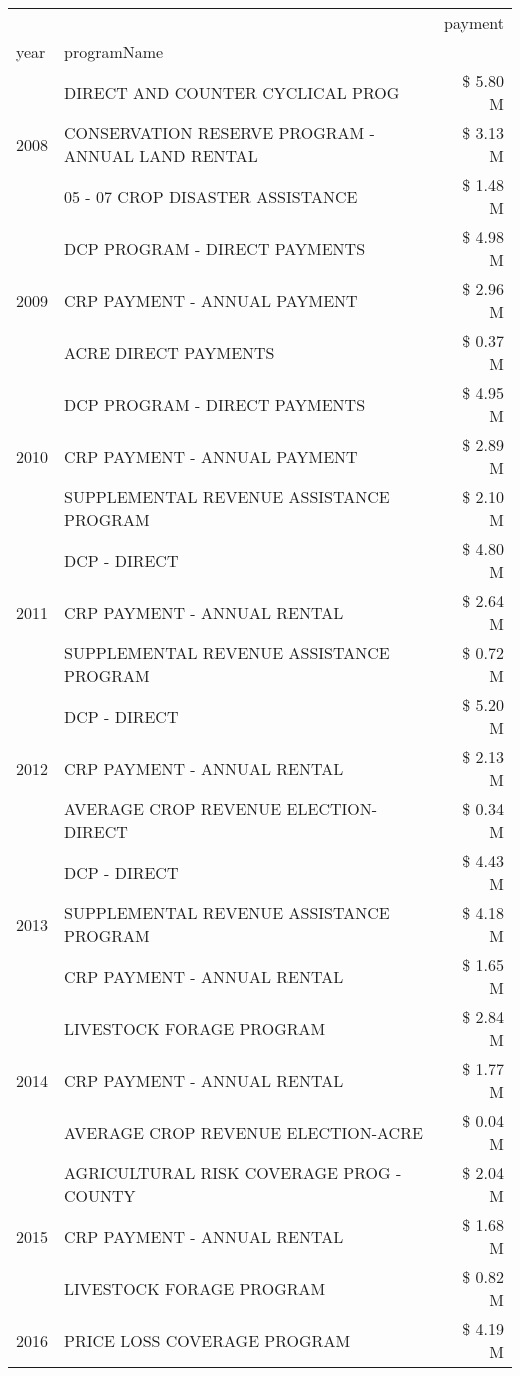 \begin{tabular}{llr}
\toprule
 &  & payment \\
year & programName &  \\
\midrule
\multirow[t]{3}{*}{2008} & DIRECT AND COUNTER CYCLICAL PROG & \$ 5.80 M \\
 & CONSERVATION RESERVE PROGRAM - ANNUAL LAND RENTAL & \$ 3.13 M \\
 & 05 - 07 CROP DISASTER ASSISTANCE & \$ 1.48 M \\
\cline{1-3}
\multirow[t]{3}{*}{2009} & DCP PROGRAM - DIRECT PAYMENTS & \$ 4.98 M \\
 & CRP PAYMENT - ANNUAL PAYMENT & \$ 2.96 M \\
 & ACRE DIRECT PAYMENTS & \$ 0.37 M \\
\cline{1-3}
\multirow[t]{3}{*}{2010} & DCP PROGRAM - DIRECT PAYMENTS & \$ 4.95 M \\
 & CRP PAYMENT - ANNUAL PAYMENT & \$ 2.89 M \\
 & SUPPLEMENTAL REVENUE ASSISTANCE PROGRAM & \$ 2.10 M \\
\cline{1-3}
\multirow[t]{3}{*}{2011} & DCP - DIRECT & \$ 4.80 M \\
 & CRP PAYMENT - ANNUAL RENTAL & \$ 2.64 M \\
 & SUPPLEMENTAL REVENUE ASSISTANCE PROGRAM & \$ 0.72 M \\
\cline{1-3}
\multirow[t]{3}{*}{2012} & DCP - DIRECT & \$ 5.20 M \\
 & CRP PAYMENT - ANNUAL RENTAL & \$ 2.13 M \\
 & AVERAGE CROP REVENUE ELECTION-DIRECT & \$ 0.34 M \\
\cline{1-3}
\multirow[t]{3}{*}{2013} & DCP - DIRECT & \$ 4.43 M \\
 & SUPPLEMENTAL REVENUE ASSISTANCE PROGRAM & \$ 4.18 M \\
 & CRP PAYMENT - ANNUAL RENTAL & \$ 1.65 M \\
\cline{1-3}
\multirow[t]{3}{*}{2014} & LIVESTOCK FORAGE PROGRAM & \$ 2.84 M \\
 & CRP PAYMENT - ANNUAL RENTAL & \$ 1.77 M \\
 & AVERAGE CROP REVENUE ELECTION-ACRE & \$ 0.04 M \\
\cline{1-3}
\multirow[t]{3}{*}{2015} & AGRICULTURAL RISK COVERAGE PROG - COUNTY & \$ 2.04 M \\
 & CRP PAYMENT - ANNUAL RENTAL & \$ 1.68 M \\
 & LIVESTOCK FORAGE PROGRAM & \$ 0.82 M \\
\cline{1-3}
\multirow[t]{3}{*}{2016} & PRICE LOSS COVERAGE PROGRAM & \$ 4.19 M \\

\end{tabular}
